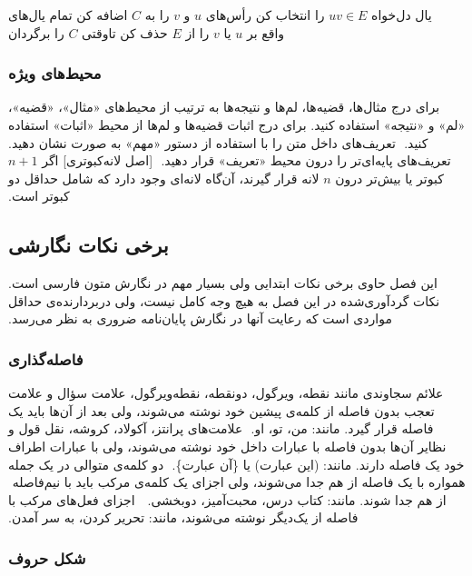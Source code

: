 ‫%
‫%
‫ یال دل‌‌خواه $uv \in E$ را انتخاب کن
‫ رأس‌های $u$ و $v$ را به $C$ اضافه کن
‫ تمام یال‌های واقع بر $u$ یا $v$ را از $E$ حذف کن
‫‌تاوقتی
‫ $C$ را برگردان
‫
‫
‫
‫\subsubsection{محیط‌های ویژه}
‫
‫برای درج مثال‌ها، قضیه‌ها، لم‌ها و نتیجه‌ها به ترتیب از محیط‌های
‫«مثال»، «قضیه»، «لم» و «نتیجه» استفاده کنید.
‫برای درج اثبات قضیه‌ها و لم‌ها  از محیط «اثبات» استفاده کنید.
‫
‫تعریف‌های داخل متن را با استفاده از دستور «مهم» به صورت  نشان دهید.
‫تعریف‌های پایه‌ای‌تر را درون محیط «تعریف» قرار دهید.
‫
‫[اصل لانه‌کبوتری]
‫اگر $n+1$ کبوتر یا بیش‌تر درون  $n$ لانه قرار گیرند، آن‌گاه لانه‌ای
‫وجود دارد که شامل حداقل دو کبوتر است.
‫
‫
‫
‫
‫
‫\subsection{برخی نکات نگارشی}
‫
‫این فصل حاوی برخی نکات ابتدایی ولی بسیار مهم در نگارش متون فارسی است.
‫نکات گردآوری‌شده در این فصل به‌ هیچ‌ وجه کامل نیست،
‫ولی دربردارنده‌ی حداقل مواردی است که رعایت آنها در نگارش پایان‌نامه ضروری به نظر می‌رسد.
‫
‫\subsubsection{فاصله‌گذاری}
‫
‫
‫
‫
‫علائم سجاوندی مانند نقطه، ویرگول، دونقطه، نقطه‌ویرگول، علامت سؤال و علامت تعجب %
‫بدون فاصله از کلمه‌ی پیشین خود نوشته می‌شوند، ولی بعد از آن‌ها باید یک فاصله‌ قرار گیرد. مانند: من، تو، او.
‫
‫علامت‌های پرانتز، آکولاد، کروشه، نقل قول و نظایر آن‌ها بدون فاصله با عبارات داخل خود نوشته می‌شوند، ولی با عبارات اطراف خود یک فاصله دارند. مانند: (این عبارت) یا \{آن عبارت\}.
‫
‫دو کلمه‌ی متوالی در یک جمله همواره با یک فاصله از هم جدا می‌شوند، ولی اجزای یک کلمه‌ی مرکب باید با نیم‌فاصله‌‌
‫ از هم جدا شوند. مانند: کتاب درس، محبت‌آمیز، دوبخشی.
‫ 
‫ اجزای فعل‌های مرکب با فاصله از یک‌دیگر نوشته می‌شوند، مانند: تحریر کردن، به سر آمدن.
‫
‫
‫
‫\subsubsection{شکل حروف}
